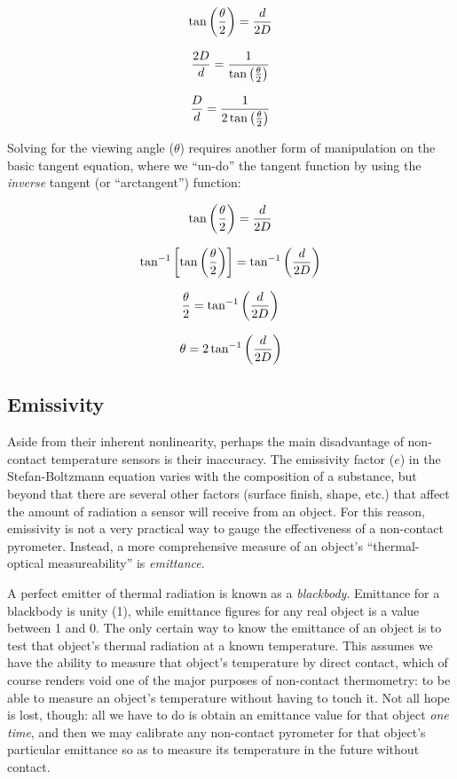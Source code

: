 $$\tan \left( {\theta \over 2} \right) = {d \over 2D}$$

$${2D \over d} = {1 \over {\tan \left( {\theta \over 2} \right)}} $$

$${D \over d} = {1 \over {2 \tan \left( {\theta \over 2} \right)}} $$

\filbreak

Solving for the viewing angle ($\theta$) requires another form of manipulation on the basic tangent equation, where we ``un-do'' the tangent function by using the \textit{inverse} tangent (or ``arctangent'') function:

$$\tan \left( {\theta \over 2} \right) = {d \over 2D}$$

$$\tan^{-1} \left[\tan \left( {\theta \over 2} \right) \right] = \tan^{-1} \left({d \over 2D}\right)$$

$$ {\theta \over 2} = \tan^{-1} \left({d \over 2D}\right)$$

$$\theta  = 2 \tan^{-1} \left({d \over 2D}\right)$$








\filbreak
\subsection{Emissivity}

Aside from their inherent nonlinearity, perhaps the main disadvantage of non-contact temperature sensors is their inaccuracy.  The emissivity factor ($e$) in the Stefan-Boltzmann equation varies with the composition of a substance, but beyond that there are several other factors (surface finish, shape, etc.) that affect the amount of radiation a sensor will receive from an object.  For this reason, emissivity is not a very practical way to gauge the effectiveness of a non-contact pyrometer.  Instead, a more comprehensive measure of an object's ``thermal-optical measureability'' is \textit{emittance}.  

A perfect emitter of thermal radiation is known as a \textit{blackbody}.  Emittance for a blackbody is unity (1), while emittance figures for any real object is a value between 1 and 0.  The only certain way to know the emittance of an object is to test that object's thermal radiation at a known temperature.  This assumes we have the ability to measure that object's temperature by direct contact, which of course renders void one of the major purposes of non-contact thermometry: to be able to measure an object's temperature without having to touch it.  Not all hope is lost, though: all we have to do is obtain an emittance value for that object \textit{one time}, and then we may calibrate any non-contact pyrometer for that object's particular emittance so as to measure its temperature in the future without contact.  

